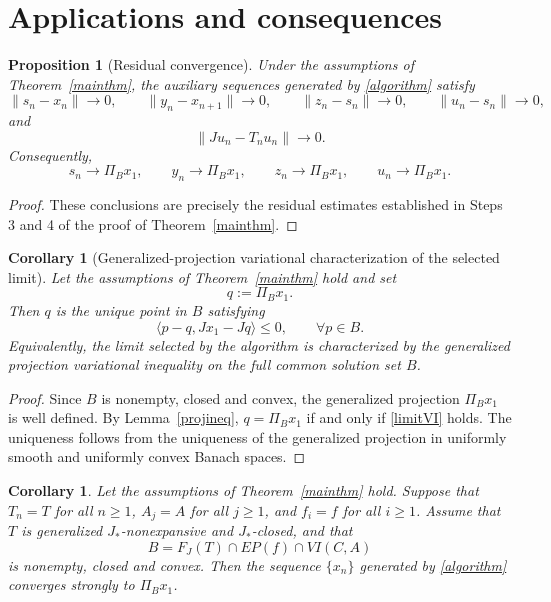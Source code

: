 \documentclass[leqno,12pt]{amsart}
\newtheorem{proposition}[theorem]{Proposition}
\newtheorem{corollary}[theorem]{Corollary}
\theoremstyle{definition}
\numberwithin{equation}{section}
\begin{document}
\section{Applications and consequences}

\begin{proposition}[Residual convergence]\label{residualprop}
Under the assumptions of Theorem~\ref{mainthm}, the auxiliary sequences generated by \eqref{algorithm} satisfy
\[
\|s_n-x_n\|\to 0,
\qquad
\|y_n-x_{n+1}\|\to 0,
\qquad
\|z_n-s_n\|\to 0,
\qquad
\|u_n-s_n\|\to 0,
\]
and
\[
\|Ju_n-T_nu_n\|\to 0.
\]
Consequently,
\[
s_n\to \Pi_Bx_1,
\qquad y_n\to \Pi_Bx_1,
\qquad z_n\to \Pi_Bx_1,
\qquad u_n\to \Pi_Bx_1.
\]
\end{proposition}

\begin{proof}
These conclusions are precisely the residual estimates established in Steps 3 and 4 of the proof of Theorem~\ref{mainthm}.
\end{proof}


\begin{corollary}[Generalized-projection variational characterization of the selected limit]\label{limitVIchar}
Let the assumptions of Theorem~\ref{mainthm} hold and set
\[
q:=\Pi_Bx_1.
\]
Then $q$ is the unique point in $B$ satisfying
\begin{equation}\label{limitVI}
\langle p-q,Jx_1-Jq\rangle\leq 0,
\qquad \forall p\in B.
\end{equation}
Equivalently, the limit selected by the algorithm is characterized by the generalized projection variational inequality on the full common solution set $B$.
\end{corollary}

\begin{proof}
Since $B$ is nonempty, closed and convex, the generalized projection $\Pi_Bx_1$ is well defined. By Lemma~\ref{projineq}, $q=\Pi_Bx_1$ if and only if \eqref{limitVI} holds. The uniqueness follows from the uniqueness of the generalized projection in uniformly smooth and uniformly convex Banach spaces.
\end{proof}

\begin{corollary}\label{singlecorollary}
Let the assumptions of Theorem~\ref{mainthm} hold. Suppose that $T_n=T$ for all $n\geq 1$, $A_j=A$ for all $j\geq 1$, and $f_i=f$ for all $i\geq 1$. Assume that $T$ is generalized $J_{*}$-nonexpansive and $J_{*}$-closed, and that
\[
B=F_J(T)\cap EP(f)\cap VI(C,A)
\]
is nonempty, closed and convex. Then the sequence $\{x_n\}$ generated by \eqref{algorithm} converges strongly to $\Pi_Bx_1$.
\end{corollary}
\end{document}
